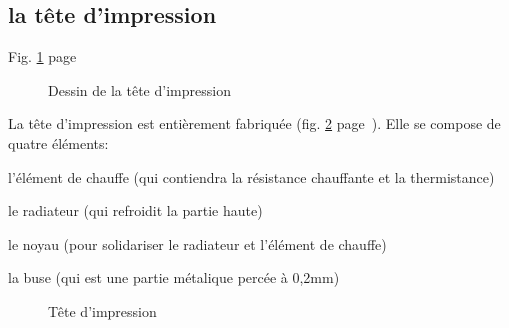 \subsection{la tête d'impression}
\noindent Fig. \ref{sch_tete} page~\pageref{sch_tete} \par %
\begin{figure}%
   \caption{\label{sch_tete} Dessin de la tête d'impression}%
\end{figure}%
La tête d'impression est entièrement fabriquée (fig. \ref{tete_impression} %
page~\pageref{tete_impression}). Elle se compose de quatre éléments:%
\begin{dinglist}{71}%
\item{l'élément de chauffe (qui contiendra la résistance chauffante et la thermistance)}%
\item{le radiateur (qui refroidit la partie haute)}%
\item{le noyau (pour solidariser le radiateur et l'élément de chauffe)}%
\item{la buse (qui est une partie métalique percée à 0,2mm)}%
\end{dinglist}%
\begin{figure}%
   \caption{\label{tete_impression} Tête d'impression}%
\end{figure}%
